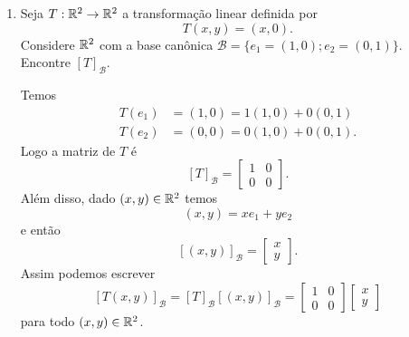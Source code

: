 \begin{exemplos}
  \begin{enumerate}[label={\arabic*})]
    \item Seja $T : \mathbb{R}^2 \to \mathbb{R}^2$ a transforma\c{c}\~ao linear definida por
    \[
      T(x,y) = (x,0).
    \]
    Considere $\mathbb{R}^2$ com a base can\^onica $\mathcal{B} = \{e_1=(1,0);e_2=(0,1)\}$. Encontre $[T]_\mathcal{B}$.
    \begin{solucao}
      Temos
      \begin{align*}
        T(e_1) &= (1,0) = 1(1,0) + 0(0,1)\\
        T(e_2) &= (0,0) = 0(1,0) + 0(0,1).
      \end{align*}
      Logo a matriz de $T$ \'e
      \[
        [T]_\mathcal{B} = \begin{bmatrix}
          1 & 0\\
          0 & 0
        \end{bmatrix}.
      \]
      Al\'em disso, dado $(x,y) \in \mathbb{R}^2$ temos
      \[
        (x,y) = xe_1 + ye_2
      \]
      e ent\~ao
      \[
        [(x,y)]_\mathcal{B} = \begin{bmatrix}
          x\\y
        \end{bmatrix}.
      \]
      Assim podemos escrever
      \[
        [T(x,y)]_\mathcal{B} = [T]_\mathcal{B}[(x,y)]_\mathcal{B} = \begin{bmatrix}
          1 & 0\\
          0 & 0
        \end{bmatrix}\begin{bmatrix}
          x\\y
        \end{bmatrix}
      \]
      para todo $(x,y) \in \mathbb{R}^2$.
    \end{solucao}


\end{enumerate}
\end{exemplos}
